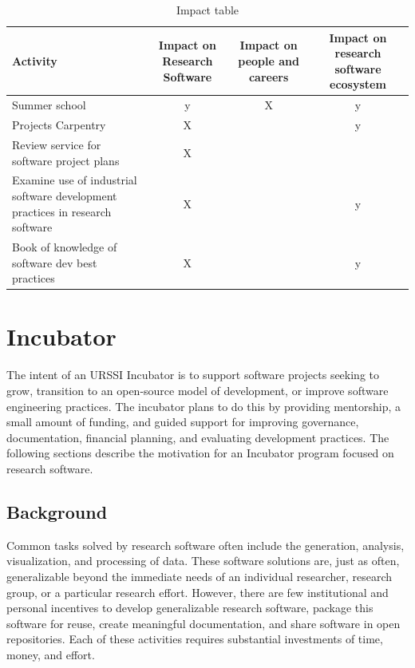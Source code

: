 \documentclass[
]{book}
\begin{document}
\begin{table}

\caption{\label{tab:unnamed-chunk-2}Impact table}
\centering
\begin{tabular}[t]{lccc}
\toprule
Activity & Impact on Research Software & Impact on people and careers & Impact on research software ecosystem\\
\midrule
Summer school & y & X & y\\
Projects Carpentry & X &  & y\\
Review service for software project plans & X &  & \\
Examine use of industrial software development practices in research software & X &  & y\\
Book of knowledge of software dev best practices & X &  & y\\
\bottomrule
\end{tabular}
\end{table}

\hypertarget{Ch-Incubator}{%
\chapter{Incubator}\label{Ch-Incubator}}

The intent of an URSSI Incubator is to support software projects seeking to grow, transition to an open-source model of development, or improve software engineering practices. The incubator plans to do this by providing mentorship, a small amount of funding, and guided support for improving governance, documentation, financial planning, and evaluating development practices. The following sections describe the motivation for an Incubator program focused on research software.

\hypertarget{background}{%
\section{Background}\label{background}}

Common tasks solved by research software often include the generation, analysis, visualization, and processing of data.
These software solutions are, just as often, generalizable beyond the immediate needs of an individual researcher, research group, or a particular research effort. However, there are few institutional and personal incentives to develop generalizable research software, package this software for reuse, create meaningful documentation, and share software in open repositories.
Each of these activities requires substantial investments of time, money, and effort.
\end{document}
